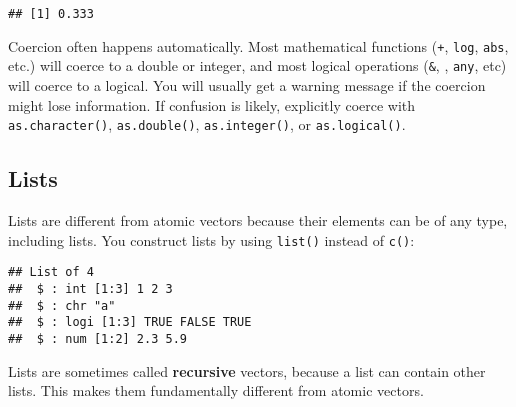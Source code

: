 \begin{Shaded}
\begin{Highlighting}[]
\end{Highlighting}
\end{Shaded}

\begin{verbatim}
## [1] 0.333
\end{verbatim}

Coercion often happens automatically. Most mathematical functions
(\texttt{+}, \texttt{log}, \texttt{abs}, etc.) will coerce to a double
or integer, and most logical operations (\texttt{\&},
\texttt{\textbar{}}, \texttt{any}, etc) will coerce to a logical. You
will usually get a warning message if the coercion might lose
information. If confusion is likely, explicitly coerce with
\texttt{as.character()}, \texttt{as.double()}, \texttt{as.integer()}, or
\texttt{as.logical()}.

\hypertarget{lists}{%
\subsection{Lists}\label{lists}}

Lists are different from atomic vectors because their elements can be of
any type, including lists. You construct lists by using \texttt{list()}
instead of \texttt{c()}:  

\begin{Shaded}
\begin{Highlighting}[]
\StringTok{ }\NormalTok{(}\OperatorTok{:}\NormalTok{, }\NormalTok{, }\NormalTok{(}\NormalTok{, }\NormalTok{, }\NormalTok{), }\NormalTok{(}\NormalTok{, }\NormalTok{))}
\end{Highlighting}
\end{Shaded}

\begin{verbatim}
## List of 4
##  $ : int [1:3] 1 2 3
##  $ : chr "a"
##  $ : logi [1:3] TRUE FALSE TRUE
##  $ : num [1:2] 2.3 5.9
\end{verbatim}

Lists are sometimes called \textbf{recursive} vectors, because a list
can contain other lists. This makes them fundamentally different from
atomic vectors.

